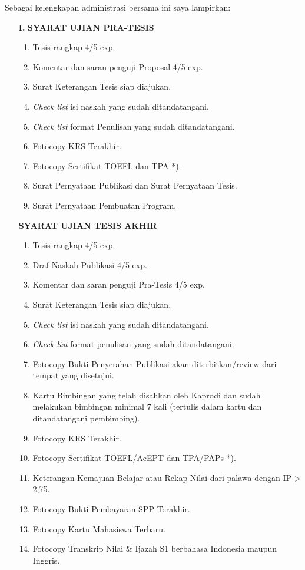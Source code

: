 \noindent
Sebagai kelengkapan administrasi bersama ini saya lampirkan:
\begin{enumerate}
	\item[\textbf{I.}] \textbf{SYARAT UJIAN PRA-TESIS}
	\begin{enumerate}
		\setlength\itemsep{0.1mm}
		\item Tesis rangkap 4/5 exp.
		\item Komentar dan saran penguji Proposal 4/5 exp.
		\item Surat Keterangan Tesis siap diajukan.
		\item \textit{Check list} isi naskah yang sudah ditandatangani.
		\item \textit{Check list} format Penulisan yang sudah ditandatangani.
		\item Fotocopy KRS Terakhir.
		\item Fotocopy Sertifikat TOEFL dan TPA *).
		\item Surat Pernyataan Publikasi dan Surat Pernyataan Tesis.
		\item Surat Pernyataan Pembuatan Program.
	\end{enumerate}
	\item[\textbf{\circled{II.}}] \textbf{SYARAT UJIAN TESIS AKHIR}
	\begin{enumerate}
		\setlength\itemsep{0.1mm}
		\item Tesis rangkap 4/5 exp.
		\item Draf Naskah Publikasi 4/5 exp.
		\item Komentar dan saran penguji Pra-Tesis 4/5 exp.
		\item Surat Keterangan Tesis siap diajukan.
		\item \textit{Check list} isi naskah yang sudah ditandatangani.
		\item \textit{Check list} format penulisan yang sudah ditandatangani.
		\item Fotocopy Bukti Penyerahan Publikasi akan diterbitkan/review dari tempat yang disetujui.
		\item Kartu Bimbingan yang telah disahkan oleh Kaprodi dan sudah melakukan bimbingan minimal 7 kali (tertulis dalam kartu dan ditandatangani pembimbing).
		\item Fotocopy KRS Terakhir.
		\item Fotocopy Sertifikat TOEFL/AcEPT dan TPA/PAPs *).
		\item Keterangan Kemajuan Belajar atau Rekap Nilai dari palawa dengan  IP > 2,75.
		\item Fotocopy Bukti Pembayaran SPP Terakhir.
		\item Fotocopy Kartu Mahasiswa Terbaru.
		\item Fotocopy Transkrip Nilai \& Ijazah S1 berbahasa Indonesia maupun Inggris.
	\end{enumerate}
\end{enumerate}

